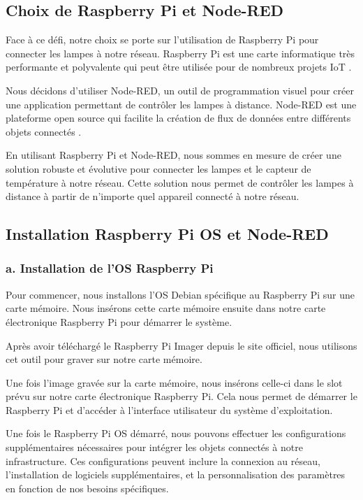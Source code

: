 \subsection{Choix de Raspberry Pi et Node-RED}

Face à ce défi, notre choix se porte sur l'utilisation de Raspberry Pi pour connecter les lampes à notre réseau. Raspberry Pi est une carte informatique très performante et polyvalente qui peut être utilisée pour de nombreux projets IoT \cite{richardson2012getting}.

Nous décidons d'utiliser Node-RED, un outil de programmation visuel pour créer une application permettant de contrôler les lampes à distance. Node-RED est une plateforme open source qui facilite la création de flux de données entre différents objets connectés \cite{lekic2018iot}.

En utilisant Raspberry Pi et Node-RED, nous sommes en mesure de créer une solution robuste et évolutive pour connecter les lampes et le capteur de température à notre réseau. Cette solution nous permet de contrôler les lampes à distance à partir de n'importe quel appareil connecté à notre réseau.

\subsection{Installation Raspberry Pi OS et Node-RED}

\subsubsection{a. Installation de l'OS Raspberry Pi}

Pour commencer, nous installons l'OS Debian spécifique au Raspberry Pi sur une carte mémoire. Nous insérons cette carte mémoire ensuite dans notre carte électronique Raspberry Pi pour démarrer le système.

Après avoir téléchargé le Raspberry Pi Imager depuis le site officiel, nous utilisons cet outil pour graver sur notre carte mémoire.
 

Une fois l'image gravée sur la carte mémoire, nous insérons celle-ci dans le slot prévu sur notre carte électronique Raspberry Pi. Cela nous permet de démarrer le Raspberry Pi et d'accéder à l'interface utilisateur du système d'exploitation.

Une fois le Raspberry Pi OS démarré, nous pouvons effectuer les configurations supplémentaires nécessaires pour intégrer les objets connectés à notre infrastructure. Ces configurations peuvent inclure la connexion au réseau, l'installation de logiciels supplémentaires, et la personnalisation des paramètres en fonction de nos besoins spécifiques.

